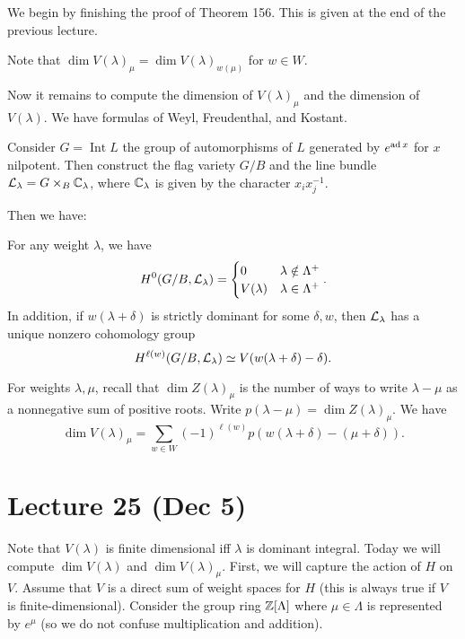 \documentclass[twoside, 10pt]{article}
\begin{document}
    We begin by finishing the proof of Theorem 156. This is given at the end of
    the previous lecture.

    \begin{cor} Note that $\dim V(\lambda)_{\mu} = \dim V(\lambda)_{w(\mu)}$
    for $w \in W$.  \end{cor}

    Now it remains to compute the dimension of $V(\lambda)_{\mu}$ and the
    dimension of $V(\lambda)$. We have formulas of Weyl, Freudenthal, and
    Kostant.

    Consider $G = \operatorname{Int} L$ the group of automorphisms of $L$
    generated by $e^{\operatorname{ad} x}$ for $x$ nilpotent. Then construct the flag variety
    $G/B$ and the line bundle $\mathcal{L}_{\lambda} = G \times_B \mathbb{C}_{\lambda}$,
    where $\mathbb{C}_{\lambda}$ is given by the character $x_ix_j^{-1}$.

    Then we have: \begin{thm} For any weight $\lambda$, we
        have \[H^0(G/B, \mathcal{L}_{\lambda}) = \begin{cases} 0 & \lambda \notin
        \Lambda^+ \\ V(\lambda) & \lambda \in \Lambda^+ \end{cases}.\] In
        addition, if $w(\lambda + \delta)$ is strictly dominant for some
        $\delta, w$, then $\mathcal{L}_{\lambda}$ has a unique nonzero cohomology
        group \[H^{\ell(w)}(G/B, \mathcal{L}_{\lambda}) \simeq V(w(\lambda+\delta) -
        \delta). \] \end{thm}

    \begin{thm} For weights $\lambda, \mu$, recall that
        $\dim Z(\lambda)_{\mu}$ is the number of ways to write $\lambda - \mu$
        as a nonnegative sum of positive roots. Write $p(\lambda - \mu) = \dim
        Z(\lambda)_{\mu}$. We have \[ \dim V(\lambda)_{\mu} = \sum_{w \in W}
        (-1)^{\ell(w)} p(w(\lambda + \delta) - (\mu + \delta)). \] \end{thm}

    \section{Lecture 25 (Dec 5)}%
    
    Note that $V(\lambda)$ is finite dimensional iff $\lambda$ is dominant
    integral. Today we will compute $\dim V(\lambda)$ and $\dim
    V(\lambda)_{\mu}$. First, we will capture the action of $H$ on $V$. Assume
    that $V$ is a direct sum of weight spaces for $H$ (this is always true if
    $V$ is finite-dimensional). Consider the group ring $\mathbb{Z}[\Lambda]$ where
    $\mu \in \Lambda$ is represented by $e^{\mu}$ (so we do not confuse
    multiplication and addition).
\end{document}
